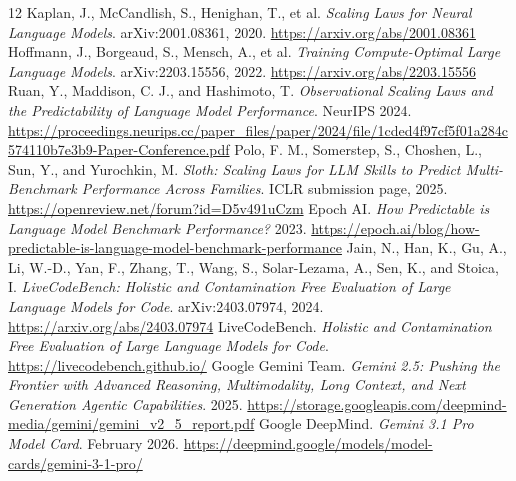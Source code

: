 \documentclass[11pt]{article}
\begin{document}
\begin{thebibliography}{12}
 Kaplan, J., McCandlish, S., Henighan, T., et al. \emph{Scaling Laws for Neural Language Models}. arXiv:2001.08361, 2020. \url{https://arxiv.org/abs/2001.08361}
 Hoffmann, J., Borgeaud, S., Mensch, A., et al. \emph{Training Compute-Optimal Large Language Models}. arXiv:2203.15556, 2022. \url{https://arxiv.org/abs/2203.15556}
 Ruan, Y., Maddison, C. J., and Hashimoto, T. \emph{Observational Scaling Laws and the Predictability of Language Model Performance}. NeurIPS 2024. \url{https://proceedings.neurips.cc/paper_files/paper/2024/file/1cded4f97cf5f01a284c574110b7e3b9-Paper-Conference.pdf}
 Polo, F. M., Somerstep, S., Choshen, L., Sun, Y., and Yurochkin, M. \emph{Sloth: Scaling Laws for LLM Skills to Predict Multi-Benchmark Performance Across Families}. ICLR submission page, 2025. \url{https://openreview.net/forum?id=D5v491uCzm}
 Epoch AI. \emph{How Predictable is Language Model Benchmark Performance?} 2023. \url{https://epoch.ai/blog/how-predictable-is-language-model-benchmark-performance}
 Jain, N., Han, K., Gu, A., Li, W.-D., Yan, F., Zhang, T., Wang, S., Solar-Lezama, A., Sen, K., and Stoica, I. \emph{LiveCodeBench: Holistic and Contamination Free Evaluation of Large Language Models for Code}. arXiv:2403.07974, 2024. \url{https://arxiv.org/abs/2403.07974}
 LiveCodeBench. \emph{Holistic and Contamination Free Evaluation of Large Language Models for Code}. \url{https://livecodebench.github.io/}
 Google Gemini Team. \emph{Gemini 2.5: Pushing the Frontier with Advanced Reasoning, Multimodality, Long Context, and Next Generation Agentic Capabilities}. 2025. \url{https://storage.googleapis.com/deepmind-media/gemini/gemini_v2_5_report.pdf}
 Google DeepMind. \emph{Gemini 3.1 Pro Model Card}. February 2026. \url{https://deepmind.google/models/model-cards/gemini-3-1-pro/}
\end{thebibliography}
\end{document}
